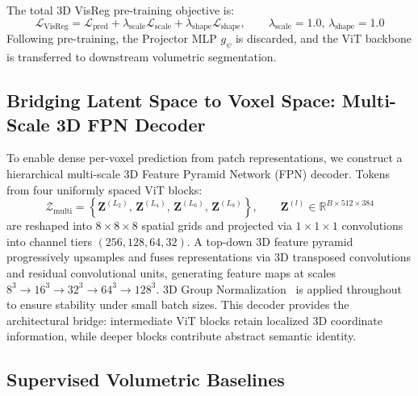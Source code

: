 \documentclass{article}
\begin{document}
The total 3D VisReg pre-training objective is:
\begin{equation}
    \mathcal{L}_{\text{VisReg}} = \mathcal{L}_{\text{pred}} + \lambda_{\text{scale}} \mathcal{L}_{\text{scale}} + \lambda_{\text{shape}} \mathcal{L}_{\text{shape}}, \qquad \lambda_{\text{scale}} = 1.0, \, \lambda_{\text{shape}} = 1.0
\end{equation}
Following pre-training, the Projector MLP $g_\psi$ is discarded, and the ViT backbone is transferred to downstream volumetric segmentation.

\subsection{Bridging Latent Space to Voxel Space: Multi-Scale 3D FPN Decoder}
\label{sec:decoder}

To enable dense per-voxel prediction from patch representations, we construct a hierarchical multi-scale 3D Feature Pyramid Network (FPN) decoder. Tokens from four uniformly spaced ViT blocks:
\begin{equation}
    \mathcal{Z}_{\text{multi}} = \left\{ \mathbf{Z}^{(L_2)}, \, \mathbf{Z}^{(L_4)}, \, \mathbf{Z}^{(L_6)}, \, \mathbf{Z}^{(L_8)} \right\}, \qquad \mathbf{Z}^{(l)} \in \mathbb{R}^{B \times 512 \times 384}
\end{equation}
are reshaped into $8 \times 8 \times 8$ spatial grids and projected via $1 \times 1 \times 1$ convolutions into channel tiers $(256, 128, 64, 32)$. A top-down 3D feature pyramid progressively upsamples and fuses representations via 3D transposed convolutions and residual convolutional units, generating feature maps at scales $8^3 \to 16^3 \to 32^3 \to 64^3 \to 128^3$. 3D Group Normalization~\citep{wu2018group} is applied throughout to ensure stability under small batch sizes. This decoder provides the architectural bridge: intermediate ViT blocks retain localized 3D coordinate information, while deeper blocks contribute abstract semantic identity.

\subsection{Supervised Volumetric Baselines}
\label{sec:baselines}
\end{document}
